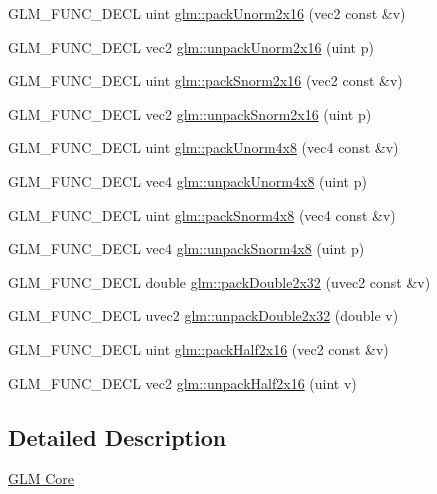 \begin{DoxyCompactItemize}
\item 
G\+L\+M\+\_\+\+F\+U\+N\+C\+\_\+\+D\+E\+CL uint \hyperlink{group__core__func__packing_ga0659ddaf09727551c7bf51655d2a65cf}{glm\+::pack\+Unorm2x16} (vec2 const \&v)
\item 
G\+L\+M\+\_\+\+F\+U\+N\+C\+\_\+\+D\+E\+CL vec2 \hyperlink{group__core__func__packing_ga11776a74e1885a14e1295d6e917a9ae2}{glm\+::unpack\+Unorm2x16} (uint p)
\item 
G\+L\+M\+\_\+\+F\+U\+N\+C\+\_\+\+D\+E\+CL uint \hyperlink{group__core__func__packing_ga0c8005de240d6c4ca3d16c7bee25c622}{glm\+::pack\+Snorm2x16} (vec2 const \&v)
\item 
G\+L\+M\+\_\+\+F\+U\+N\+C\+\_\+\+D\+E\+CL vec2 \hyperlink{group__core__func__packing_gae5f30f599243df9525315edecae09a7f}{glm\+::unpack\+Snorm2x16} (uint p)
\item 
G\+L\+M\+\_\+\+F\+U\+N\+C\+\_\+\+D\+E\+CL uint \hyperlink{group__core__func__packing_ga834ee9a9e73dcb0a7c1fc88143f3edb8}{glm\+::pack\+Unorm4x8} (vec4 const \&v)
\item 
G\+L\+M\+\_\+\+F\+U\+N\+C\+\_\+\+D\+E\+CL vec4 \hyperlink{group__core__func__packing_ga1ec646af4b27982d175672bddd642792}{glm\+::unpack\+Unorm4x8} (uint p)
\item 
G\+L\+M\+\_\+\+F\+U\+N\+C\+\_\+\+D\+E\+CL uint \hyperlink{group__core__func__packing_gafcf25acc0d361c6c696a433aa5dfd16b}{glm\+::pack\+Snorm4x8} (vec4 const \&v)
\item 
G\+L\+M\+\_\+\+F\+U\+N\+C\+\_\+\+D\+E\+CL vec4 \hyperlink{group__core__func__packing_ga4b18a0480e7260401d97f40cacd6bc36}{glm\+::unpack\+Snorm4x8} (uint p)
\item 
G\+L\+M\+\_\+\+F\+U\+N\+C\+\_\+\+D\+E\+CL double \hyperlink{group__core__func__packing_gaf728fdfb98ce34da6f968d9f6bf154d7}{glm\+::pack\+Double2x32} (uvec2 const \&v)
\item 
G\+L\+M\+\_\+\+F\+U\+N\+C\+\_\+\+D\+E\+CL uvec2 \hyperlink{group__core__func__packing_gaea67aa4d065175e7746b2a8a2d00cedb}{glm\+::unpack\+Double2x32} (double v)
\item 
G\+L\+M\+\_\+\+F\+U\+N\+C\+\_\+\+D\+E\+CL uint \hyperlink{group__core__func__packing_ga082f6dd65f73a547ed3067ef00be036f}{glm\+::pack\+Half2x16} (vec2 const \&v)
\item 
G\+L\+M\+\_\+\+F\+U\+N\+C\+\_\+\+D\+E\+CL vec2 \hyperlink{group__core__func__packing_ga90be544929ed83fa7039208bbab8c0ba}{glm\+::unpack\+Half2x16} (uint v)
\end{DoxyCompactItemize}


\subsection{Detailed Description}
\hyperlink{group__core}{G\+LM Core} 